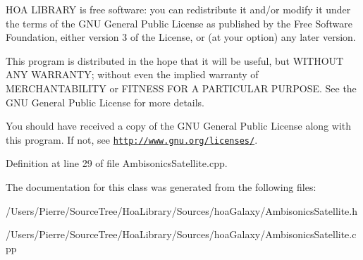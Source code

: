 H\-O\-A L\-I\-B\-R\-A\-R\-Y is free software\-: you can redistribute it and/or modify it under the terms of the G\-N\-U General Public License as published by the Free Software Foundation, either version 3 of the License, or (at your option) any later version.

This program is distributed in the hope that it will be useful, but W\-I\-T\-H\-O\-U\-T A\-N\-Y W\-A\-R\-R\-A\-N\-T\-Y; without even the implied warranty of M\-E\-R\-C\-H\-A\-N\-T\-A\-B\-I\-L\-I\-T\-Y or F\-I\-T\-N\-E\-S\-S F\-O\-R A P\-A\-R\-T\-I\-C\-U\-L\-A\-R P\-U\-R\-P\-O\-S\-E. See the G\-N\-U General Public License for more details.

You should have received a copy of the G\-N\-U General Public License along with this program. If not, see \href{http://www.gnu.org/licenses/}{\tt http\-://www.\-gnu.\-org/licenses/}. 

Definition at line 29 of file Ambisonics\-Satellite.\-cpp.



The documentation for this class was generated from the following files\-:\begin{DoxyCompactItemize}
\item 
/\-Users/\-Pierre/\-Source\-Tree/\-Hoa\-Library/\-Sources/hoa\-Galaxy/Ambisonics\-Satellite.\-h\item 
/\-Users/\-Pierre/\-Source\-Tree/\-Hoa\-Library/\-Sources/hoa\-Galaxy/Ambisonics\-Satellite.\-cpp\end{DoxyCompactItemize}
